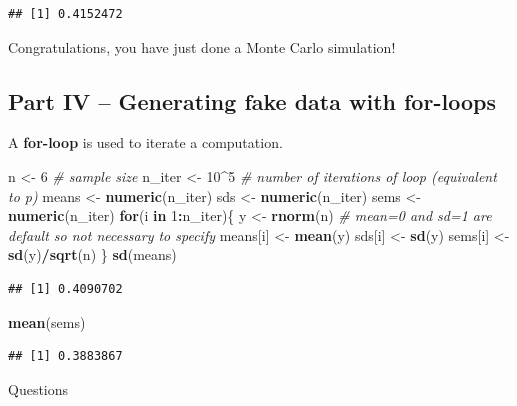 \documentclass[]{book}
\newenvironment{Shaded}{\begin{snugshade}}{\end{snugshade}}
\newcommand{\KeywordTok}[1]{\textcolor[rgb]{0.13,0.29,0.53}{\textbf{#1}}}
\newcommand{\DecValTok}[1]{\textcolor[rgb]{0.00,0.00,0.81}{#1}}
\newcommand{\StringTok}[1]{\textcolor[rgb]{0.31,0.60,0.02}{#1}}
\newcommand{\CommentTok}[1]{\textcolor[rgb]{0.56,0.35,0.01}{\textit{#1}}}
\newcommand{\ControlFlowTok}[1]{\textcolor[rgb]{0.13,0.29,0.53}{\textbf{#1}}}
\newcommand{\OperatorTok}[1]{\textcolor[rgb]{0.81,0.36,0.00}{\textbf{#1}}}
\newcommand{\NormalTok}[1]{#1}
\begin{document}
\begin{verbatim}
## [1] 0.4152472
\end{verbatim}

Congratulations, you have just done a Monte Carlo simulation!

\subsection{Part IV -- Generating fake data with
for-loops}\label{part-iv-generating-fake-data-with-for-loops}

A \textbf{for-loop} is used to iterate a computation.

\begin{Shaded}
\begin{Highlighting}[]
\NormalTok{n <-}\StringTok{ }\DecValTok{6} \CommentTok{# sample size}
\NormalTok{n_iter <-}\StringTok{ }\DecValTok{10}\OperatorTok{^}\DecValTok{5} \CommentTok{# number of iterations of loop (equivalent to p)}
\NormalTok{means <-}\StringTok{ }\KeywordTok{numeric}\NormalTok{(n_iter)}
\NormalTok{sds <-}\StringTok{ }\KeywordTok{numeric}\NormalTok{(n_iter)}
\NormalTok{sems <-}\StringTok{ }\KeywordTok{numeric}\NormalTok{(n_iter)}
\ControlFlowTok{for}\NormalTok{(i }\ControlFlowTok{in} \DecValTok{1}\OperatorTok{:}\NormalTok{n_iter)\{}
\NormalTok{  y <-}\StringTok{ }\KeywordTok{rnorm}\NormalTok{(n) }\CommentTok{# mean=0 and sd=1 are default so not necessary to specify}
\NormalTok{  means[i] <-}\StringTok{ }\KeywordTok{mean}\NormalTok{(y)}
\NormalTok{  sds[i] <-}\StringTok{ }\KeywordTok{sd}\NormalTok{(y)}
\NormalTok{  sems[i] <-}\StringTok{ }\KeywordTok{sd}\NormalTok{(y)}\OperatorTok{/}\KeywordTok{sqrt}\NormalTok{(n)}
\NormalTok{\}}
\KeywordTok{sd}\NormalTok{(means)}
\end{Highlighting}
\end{Shaded}

\begin{verbatim}
## [1] 0.4090702
\end{verbatim}

\begin{Shaded}
\begin{Highlighting}[]
\KeywordTok{mean}\NormalTok{(sems)}
\end{Highlighting}
\end{Shaded}

\begin{verbatim}
## [1] 0.3883867
\end{verbatim}

Questions
\end{document}
